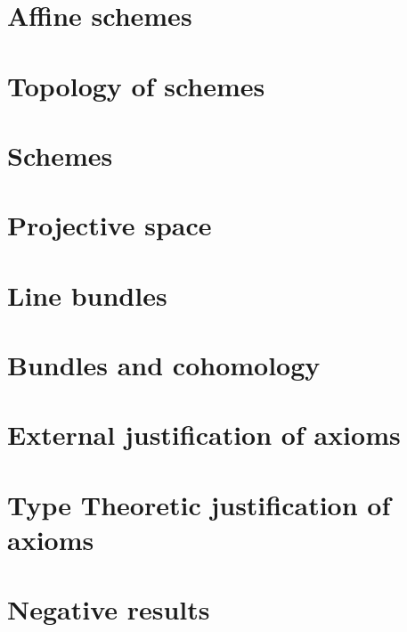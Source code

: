 \documentclass{../util/zariski}
\begin{document}
\section{Affine schemes}


\section{Topology of schemes}


\section{Schemes}


\section{Projective space}


\section{Line bundles}


\section{Bundles and cohomology}


\section{External justification of axioms}


\section{Type Theoretic justification of axioms}


\appendix

\section{Negative results}


\printindex

\printbibliography
\end{document}
